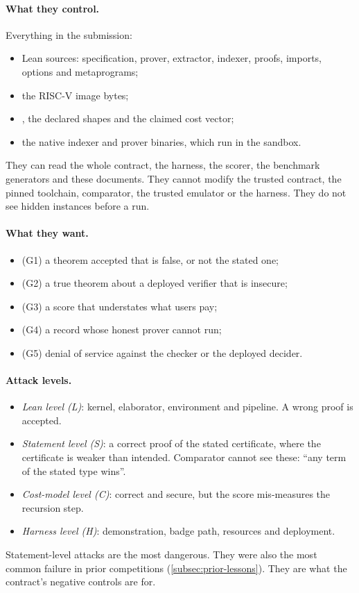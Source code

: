 \paragraph{What they control.} Everything in the submission:
\begin{itemize}[nosep]
\item Lean sources: specification, prover, extractor, indexer, proofs, imports, options and
  metaprograms;
\item the RISC-V image bytes;
\item {}, the declared shapes and the claimed cost vector;
\item the native indexer and prover binaries, which run in the sandbox.
\end{itemize}
They can read the whole contract, the harness, the scorer, the benchmark generators and these
documents. They cannot modify the trusted contract, the pinned toolchain, comparator, the trusted
emulator or the harness. They do not see hidden instances before a run.

\paragraph{What they want.}
\begin{itemize}[nosep]
\item (G1) a theorem accepted that is false, or not the stated one;
\item (G2) a true theorem about a deployed verifier that is insecure;
\item (G3) a score that understates what users pay;
\item (G4) a record whose honest prover cannot run;
\item (G5) denial of service against the checker or the deployed decider.
\end{itemize}

\paragraph{Attack levels.}
\begin{itemize}[nosep]
\item \emph{Lean level (L)}: kernel, elaborator, environment and pipeline. A wrong proof is accepted.
\item \emph{Statement level (S)}: a correct proof of the stated certificate, where the certificate is
  weaker than intended. Comparator cannot see these: \enquote{any term of the stated type wins}.
\item \emph{Cost-model level (C)}: correct and secure, but the score mis-measures the recursion step.
\item \emph{Harness level (H)}: demonstration, badge path, resources and deployment.
\end{itemize}
Statement-level attacks are the most dangerous. They were also the most common failure in prior
competitions (\cref{subsec:prior-lessons}). They are what the contract's negative controls are for.

